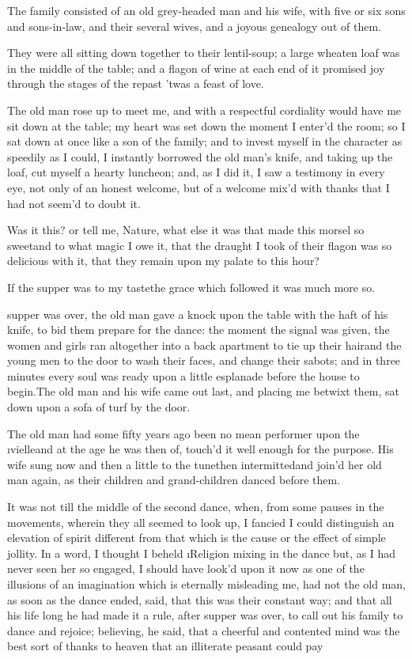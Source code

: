 \documentclass[twoside]{article}
\begin{document}
The family consisted of an old grey-headed
man and his wife, with five or six sons
and sons-in-law, and their several wives,
and a joyous genealogy out of them.

They were all sitting down together to
their lentil-soup; a large wheaten loaf
was in the middle of the table; and a
flagon of wine at each end of it promised
joy through the stages of the repast\tskk
’twas a feast of love.

The old man rose up to meet me, and with a
respectful cordiality would have me sit
down at the table; my heart was set down
the moment I enter’d the room; so I sat
down at once like a son of the family; and
to invest myself in the character as
speedily as I could, I instantly borrowed
the old man’s knife, and taking up the
loaf, cut myself a hearty luncheon; and,
as I did it, I saw a testimony in every
eye, not only of an honest welcome, but of
a welcome mix’d with thanks that I had not
seem’d to doubt it.

Was it this? or tell me, Nature, what else
it was that made this morsel so
sweet\tskk and to what magic I owe it,
that the draught I took of their flagon
was so delicious with it, that they remain
upon my palate to this hour?

If the supper was to my taste\tskk the
grace which followed it was much more so.





\vskip 6pt


 supper was over, the old
man gave a knock upon the table with the
haft of his knife, to bid them prepare for
the dance: the moment the signal was
given, the women and girls ran altogether
into a back apartment to tie up their
hair\tskk and the young men to the door
to wash their faces, and change their
sabots; and in three minutes every soul
was ready upon a little esplanade before
the house to begin.\tskk The old man and
his wife came out last, and placing me
betwixt them, sat down upon a sofa of turf
by the door.

The old man had some fifty years ago been
no mean performer upon the
\i{vielle}\tskk and at the age he was
then of, touch’d it well enough for the
purpose.  His wife sung now and then a
little to the tune\tskk then
intermitted\tskk and join’d her old man
again, as their children and
grand-children danced before them.

It was not till the middle of the second
dance, when, from some pauses in the
movements, wherein they all seemed to look
up, I fancied I could distinguish an
elevation of spirit different from that
which is the cause or the effect of simple
jollity.  In a word, I thought I beheld
\i{Religion} mixing in the dance\tskk
but, as I had never seen her so engaged, I
should have look’d upon it now as one of
the illusions of an imagination which is
eternally misleading me, had not the old
man, as soon as the dance ended, said,
that this was their constant way; and that
all his life long he had made it a rule,
after supper was over, to call out his
family to dance and rejoice; believing, he
said, that a cheerful and contented mind
was the best sort of thanks to heaven that
an illiterate peasant could pay\tskk 
\end{document}
